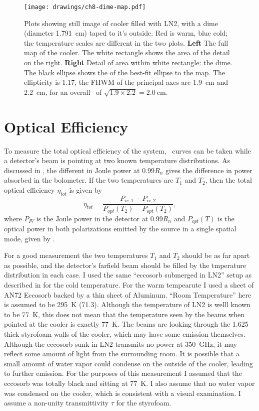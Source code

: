 \begin{figure}[th]
\centering
\texttt{[image: drawings/ch8-dime-map.pdf]}
\caption{
  Plots showing still image of cooler filled with LN2, with a dime (diameter \SI{1.791}{\cm}) taped to it's outside.
  Red is warm, blue cold; the temperature scales are different in the two plots.
  \textbf{Left} The full map of the cooler. The white rectangle shows the area of the detail on the right.
  \textbf{Right} Detail of area within white rectangle: the dime.
  The black ellipse shows the \FWHM of the best-fit ellipse to the map. The ellipticity is \num{1.17}, the FHWM of the principal axes are \SI{1.9}{\cm} and \SI{2.2}{\cm}, for an overall \FWHM\ of $\sqrt{1.9 \times 2.2} = \SI{2.0}{\cm}$.
}
\label{fig:ch8-dime-map}
\end{figure}

\section{Optical Efficiency} \label{sec:ch8-opt-eff}

To measure the total optical efficiency of the system, \IV\ curves can be taken while a detector's beam is pointing at two known temperature distributions.
As discussed in , the different in Joule power at $0.99 R_n$ gives the difference in power absorbed in the bolometer.
If the two temperatures are $T_1$ and $T_2$, then the total optical efficiency $\eta_{tot}$ is given by
\begin{equation}
  \eta_{tot} = \frac{P_{iv,1} - P_{iv,2}}{P_{opt}(T_2) - P_{opt}(T_2)},
\end{equation}
where $P_{IV}$ is the Joule power in the detector at $0.99 R_n$ and $P_{opt}(T)$ is the optical power in both polarizations emitted by the source in a single spatial mode, given by .

For a good measurement the two temperatures $T_1$ and $T_2$ should be as far apart as possible, and the detector's farfield beam should be filled by the tmperature distribution in each case.
I used the same ``eccosorb submerged in LN2'' setup as described in  for the cold temperature.
For the warm tempearute I used a sheet of AN72 Eccosorb backed by a thin sheet of Aluminum.
``Room Temperature'' here is assumed to be \SI{295}{\kelvin} (\SI{71.3}{\fahrenheit}).
Although the temperature of LN2 is welll known to be \SI{77}{\kelvin}, this does not mean that the temperature seen by the beams when pointed at the cooler is exactly \SI{77}{\kelvin}.
The beams are looking through the \SI{1.625}{\in} thick styrofoam walls of the cooler, which may have some emission themselves.
Although the eccosorb sunk in LN2 transmits no power at \SI{350}{\GHz}, it may reflect some amount of light from the surrounding room.
It is possible that a small amount of water vapor could condense on the outside of the cooler, leading to further emission.
For the purposes of this measurement I assumed that the eccosorb was totally black and sitting at \SI{77}{\kelvin}.
I also assume that no water vapor was condensed on the cooler, which is consistent with a visual examination.
I assume a non-unity transmittivity $\tau$ for the styrofoam.


